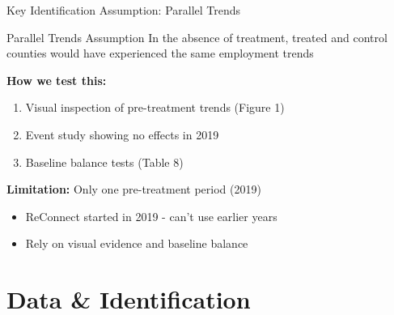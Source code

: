 \documentclass[aspectratio=169]{beamer}
\begin{document}
\begin{frame}{Key Identification Assumption: Parallel Trends}
\begin{block}{Parallel Trends Assumption}
In the absence of treatment, treated and control counties would have experienced the same employment trends
\end{block}



\vspace{0.3cm}

\textbf{How we test this:}
\begin{enumerate}
    \item Visual inspection of pre-treatment trends (Figure 1)
    \item Event study showing no effects in 2019
    \item Baseline balance tests (Table 8)
\end{enumerate}



\vspace{0.3cm}

\textbf{Limitation:} Only one pre-treatment period (2019)
\begin{itemize}
    \item ReConnect started in 2019 - can't use earlier years
    \item Rely on visual evidence and baseline balance
\end{itemize}
\end{frame}

\section{Data \& Identification}
\end{document}
